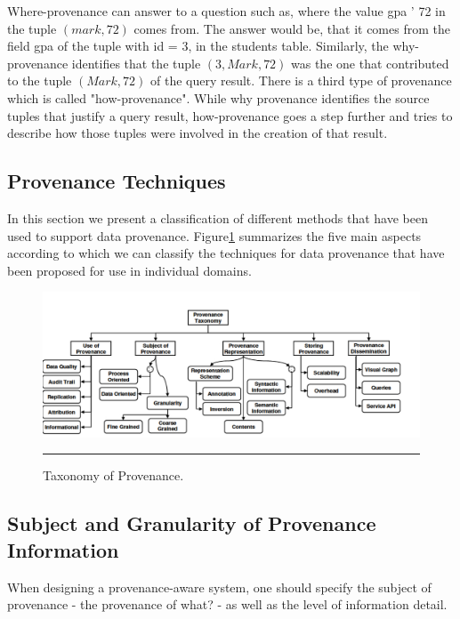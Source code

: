 Where-provenance can answer to a question such as, where the value gpa ' 72 in the tuple $(mark, 72)$ comes from. The answer would be, that it comes from the field gpa of the tuple with id = 3, in the students table.  Similarly, the why-provenance identifies that the tuple $(3, Mark, 72)$ was the one that contributed to the tuple $(Mark, 72)$ of the query result.
There is a third type of provenance which is called "how-provenance"\cite{reference1:188}. While why provenance identifies the source tuples that justify a query result, how-provenance goes a step further and tries to describe how those tuples were involved in the creation of that result.

\subsection{Provenance Techniques}

In this section we present a classification of different methods that have been used to support data provenance. Figure\ref{fig:provTaxonomy} summarizes the five main aspects according to which we can classify the techniques for data provenance that have been proposed for use in individual domains\cite{reference4}.

\begin{figure}[htbp]
	\centering
		\includegraphics[scale=0.35]{./Figures/chapter2/figure2.pdf}
		\rule{35em}{0.5pt}
	\caption[Taxonomy of Provenance]{Taxonomy of Provenance\cite{reference4}.}
	\label{fig:provTaxonomy}
\end{figure}

\subsection{Subject and Granularity of Provenance Information}

When designing a provenance-aware system, one should specify the subject of provenance - the provenance of what? -  as well as the level of information detail.

